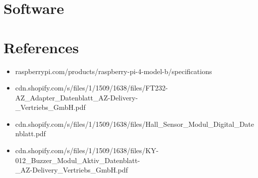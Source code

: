 \documentclass[]{article}
\begin{document}
\section{Software}

\section{References}

\begin{itemize}
    \item raspberrypi.com/products/raspberry-pi-4-model-b/specifications
    \item cdn.shopify.com/s/files/1/1509/1638/files/FT232-AZ\_Adapter\_Datenblatt\_AZ-Delivery-
    \\\_Vertriebs\_GmbH.pdf
    \item cdn.shopify.com/s/files/1/1509/1638/files/Hall\_Sensor\_Modul\_Digital\_Datenblatt.pdf
    \item cdn.shopify.com/s/files/1/1509/1638/files/KY-012\_Buzzer\_Modul\_Aktiv\_Datenblatt-
    \\\_AZ-Delivery\_Vertriebs\_GmbH.pdf
\end{itemize}
\end{document}
